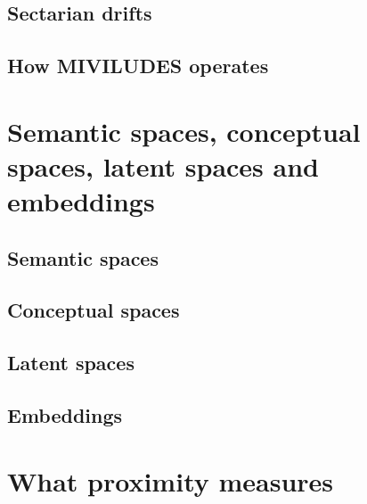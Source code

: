 \subsection{Sectarian drifts}
\label{subsec:sectarian_drifts}

\subsection{How MIVILUDES operates}
\label{subsec:miviludes_operates}

\section{Semantic spaces, conceptual spaces, latent spaces and embeddings}
\label{sec:spaces}

\subsection{Semantic spaces}
\label{subsec:semantic_spaces}

\subsection{Conceptual spaces}
\label{subsec:conceptual_spaces}

\subsection{Latent spaces}
\label{subsec:latent_spaces}

\subsection{Embeddings}
\label{subsec:embeddings}

\section{What proximity measures}
\label{sec:proximity}

